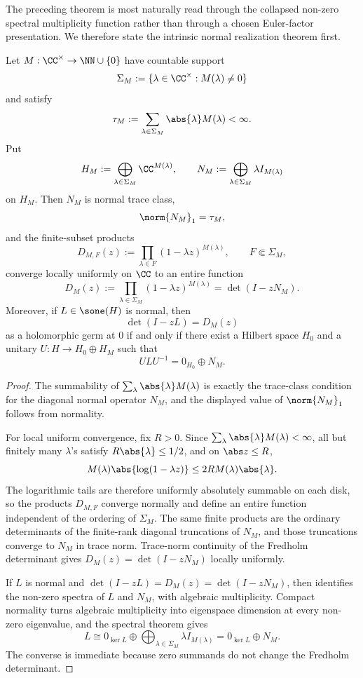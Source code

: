 The preceding theorem is most naturally read through the collapsed
non-zero spectral multiplicity function rather than through a chosen
Euler-factor presentation. We therefore state the intrinsic normal
realization theorem first.

\begin{theorem}
  \label{thm:collapsed-multiset-normal-realization}
  Let \(M:\CC^\times\to\NN\cup\{0\}\) have countable support
  \[
    \Sigma_M:=\{\lambda\in\CC^\times:M(\lambda)\neq0\}
  \]
  and satisfy
  \[
    \tau_M:=\sum_{\lambda\in\Sigma_M}\abs{\lambda}M(\lambda)<\infty.
  \]
  Put
  \[
    H_M:=\bigoplus_{\lambda\in\Sigma_M}\CC^{M(\lambda)},
    \qquad
    N_M:=\bigoplus_{\lambda\in\Sigma_M}\lambda I_{M(\lambda)}
  \]
  on \(H_M\). Then \(N_M\) is normal trace class,
  \[
    \norm{N_M}_1=\tau_M,
  \]
  and the finite-subset products
  \[
    D_{M,F}(z):=\prod_{\lambda\in F}(1-\lambda z)^{M(\lambda)},
    \qquad F\Subset\Sigma_M,
  \]
  converge locally uniformly on \(\CC\) to an entire function
  \[
    D_M(z):=\prod_{\lambda\in\Sigma_M}(1-\lambda z)^{M(\lambda)}
    =\det(I-zN_M).
  \]
  Moreover, if \(L\in\sone(H)\) is normal, then
  \[
    \det(I-zL)=D_M(z)
  \]
  as a holomorphic germ at \(0\) if and only if there exist a Hilbert
  space \(H_0\) and a unitary \(U:H\to H_0\oplus H_M\) such that
  \[
    ULU^{-1}=0_{H_0}\oplus N_M .
  \]
\end{theorem}

\begin{proof}
  The summability of \(\sum_{\lambda}\abs{\lambda}M(\lambda)\) is exactly
  the trace-class condition for the diagonal normal operator \(N_M\), and
  the displayed value of \(\norm{N_M}_1\) follows from normality.

  For local uniform convergence, fix \(R>0\). Since
  \(\sum_\lambda\abs{\lambda}M(\lambda)<\infty\), all but finitely many
  \(\lambda\)'s satisfy \(R\abs{\lambda}\le1/2\), and on
  \(\abs z\le R\),
  \[
    M(\lambda)\abs{\log(1-\lambda z)}
    \le 2RM(\lambda)\abs{\lambda}.
  \]
  The logarithmic tails are therefore uniformly absolutely summable on
  each disk, so the products \(D_{M,F}\) converge normally and define an
  entire function independent of the ordering of \(\Sigma_M\). The same
  finite products are the ordinary determinants of the finite-rank
  diagonal truncations of \(N_M\), and those truncations converge to
  \(N_M\) in trace norm. Trace-norm continuity of the Fredholm
  determinant gives
  \(D_M(z)=\det(I-zN_M)\) locally uniformly.

  If \(L\) is normal and
  \(\det(I-zL)=D_M(z)=\det(I-zN_M)\), then
   identifies the non-zero spectra
  of \(L\) and \(N_M\), with algebraic multiplicity. Compact normality
  turns algebraic multiplicity into eigenspace dimension at every
  non-zero eigenvalue, and the spectral theorem gives
  \[
    L\cong 0_{\ker L}\oplus
      \bigoplus_{\lambda\in\Sigma_M}\lambda I_{M(\lambda)}
    =0_{\ker L}\oplus N_M .
  \]
  The converse is immediate because zero summands do not change the
  Fredholm determinant.
\end{proof}

